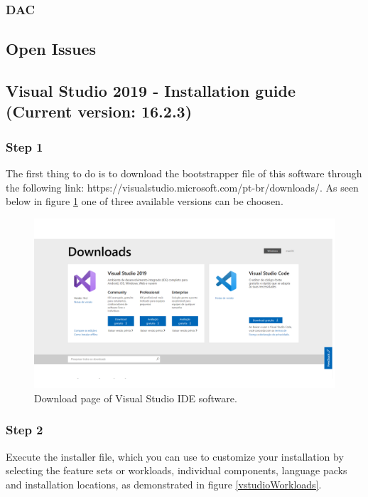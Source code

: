 \begin{refsection}
	\subsubsection{DAC}
	

	
	\subsection{Open Issues}
	
	\clearpage
	\subsection{Visual Studio 2019 - Installation guide (Current version: 16.2.3)}
	
	\subsubsection{Step 1}
	
	The first thing to do is to download the bootstrapper file of this software through the following link: https://visualstudio.microsoft.com/pt-br/downloads/. As seen below in figure \ref{vstudio} one of three available versions can be choosen.
	
	\begin{figure}[H]
		\centering
		\includegraphics[width=1\linewidth]{./sdf/arduino_quantum_rx/figures/vsDownload.pdf}
		\caption{Download page of Visual Studio IDE software.}
		\label{vstudio}
	\end{figure}
	
	
	\subsubsection{Step 2}
	
	Execute the installer file, which you can use to customize your installation by selecting the feature sets or workloads, individual components, language packs and installation locations, as demonstrated in figure \ref{vstudioWorkloads}.
	

\end{refsection}
